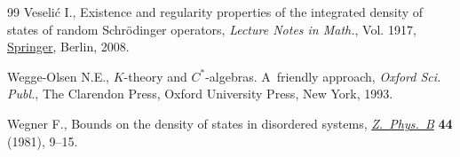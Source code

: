 \documentclass[pdftex]{sigma}
\numberwithin{equation}{section}
\begin{document}
\begin{thebibliography}{99}
Veseli\'c I., Existence and regularity properties of the integrated density of
 states of random {S}chr\"odinger operators, \textit{Lecture Notes in Math.},
 Vol. 1917, \href{https://doi.org/10.1007/978-3-540-72691-3}{Springer}, Berlin, 2008.

Wegge-Olsen N.E., {$K$}-theory and {$C^*$}-algebras. {A}~friendly approach,
 \textit{Oxford Sci. Publ.}, The Clarendon Press, Oxford University Press, New York,
 1993.

Wegner F., Bounds on the density of states in disordered systems,
 \href{https://doi.org/10.1007/BF01292646}{\textit{Z.~Phys.~B}} \textbf{44} (1981), 9--15.

\end{thebibliography}\LastPageEnding
\end{document}
